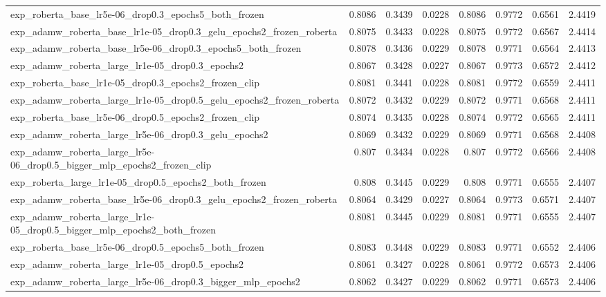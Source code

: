 \documentclass[a4paper,oneside,bibliography=totoc]{scrbook}
\begin{document}
\begin{landscape}
\begin{center}
\begin{longtable}{p{4cm} *{7}{r}}
        exp\_roberta\_base\_lr5e-06\_drop0.3\_epochs5\_both\_frozen & 0.8086 & 0.3439 & 0.0228 & 0.8086 & 0.9772 & 0.6561 & 2.4419 \\ 
        exp\_adamw\_roberta\_base\_lr1e-05\_drop0.3\_gelu\_epochs2\_frozen\_roberta & 0.8075 & 0.3433 & 0.0228 & 0.8075 & 0.9772 & 0.6567 & 2.4414 \\ 
        exp\_adamw\_roberta\_base\_lr5e-06\_drop0.3\_epochs5\_both\_frozen & 0.8078 & 0.3436 & 0.0229 & 0.8078 & 0.9771 & 0.6564 & 2.4413 \\ 
        exp\_adamw\_roberta\_large\_lr1e-05\_drop0.3\_epochs2 & 0.8067 & 0.3428 & 0.0227 & 0.8067 & 0.9773 & 0.6572 & 2.4412 \\ 
        exp\_roberta\_base\_lr1e-05\_drop0.3\_epochs2\_frozen\_clip & 0.8081 & 0.3441 & 0.0228 & 0.8081 & 0.9772 & 0.6559 & 2.4411 \\ 
        exp\_adamw\_roberta\_large\_lr1e-05\_drop0.5\_gelu\_epochs2\_frozen\_roberta & 0.8072 & 0.3432 & 0.0229 & 0.8072 & 0.9771 & 0.6568 & 2.4411 \\ 
        exp\_roberta\_base\_lr5e-06\_drop0.5\_epochs2\_frozen\_clip & 0.8074 & 0.3435 & 0.0228 & 0.8074 & 0.9772 & 0.6565 & 2.4411 \\ 
        exp\_adamw\_roberta\_large\_lr5e-06\_drop0.3\_gelu\_epochs2 & 0.8069 & 0.3432 & 0.0229 & 0.8069 & 0.9771 & 0.6568 & 2.4408 \\ 
        exp\_adamw\_roberta\_large\_lr5e-06\_drop0.5\_bigger\_mlp\_epochs2\_frozen\_clip & 0.807 & 0.3434 & 0.0228 & 0.807 & 0.9772 & 0.6566 & 2.4408 \\ 
        exp\_roberta\_large\_lr1e-05\_drop0.5\_epochs2\_both\_frozen & 0.808 & 0.3445 & 0.0229 & 0.808 & 0.9771 & 0.6555 & 2.4407 \\ 
        exp\_adamw\_roberta\_base\_lr5e-06\_drop0.3\_gelu\_epochs2\_frozen\_roberta & 0.8064 & 0.3429 & 0.0227 & 0.8064 & 0.9773 & 0.6571 & 2.4407 \\ 
        exp\_adamw\_roberta\_large\_lr1e-05\_drop0.5\_bigger\_mlp\_epochs2\_both\_frozen & 0.8081 & 0.3445 & 0.0229 & 0.8081 & 0.9771 & 0.6555 & 2.4407 \\ 
        exp\_roberta\_base\_lr5e-06\_drop0.5\_epochs5\_both\_frozen & 0.8083 & 0.3448 & 0.0229 & 0.8083 & 0.9771 & 0.6552 & 2.4406 \\ 
        exp\_adamw\_roberta\_large\_lr1e-05\_drop0.5\_epochs2 & 0.8061 & 0.3427 & 0.0228 & 0.8061 & 0.9772 & 0.6573 & 2.4406 \\ 
        exp\_adamw\_roberta\_large\_lr5e-06\_drop0.3\_bigger\_mlp\_epochs2 & 0.8062 & 0.3427 & 0.0229 & 0.8062 & 0.9771 & 0.6573 & 2.4406 \\ 

\end{longtable}
\end{center}
\end{landscape}
\end{document}
